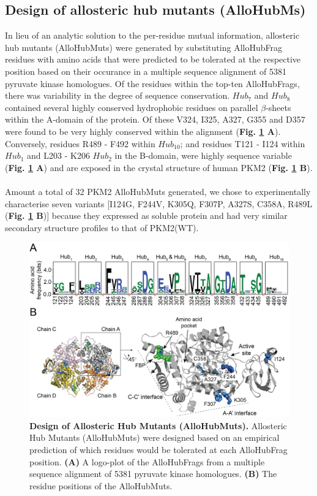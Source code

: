 \subsection{Design of allosteric hub mutants (AlloHubMs)}
In lieu of an analytic solution to the per-residue mutual information, allosteric hub mutants (AlloHubMuts) were generated by substituting AlloHubFrag residues with amino acids that were predicted to be tolerated at the respective position based on their occurance in a multiple sequence alignment of 5381 pyruvate kinase homologues. Of the residues within the top-ten AlloHubFrags, there was variability in the degree of sequence conservation. $Hub_7$ and $Hub_8$  contained several highly conserved hydrophobic residues on parallel $\beta$-sheets within the A-domain of the protein. Of these V324, I325, A327, G355 and D357 were found to be very highly conserved within the alignment (\textbf{Fig. \ref{fig:allohub_design} A}). Conversely, residues R489 - F492 within $Hub_{10}$; and residues T121 - I124 within $Hub_1$ and L203 - K206 $Hub_2$ in the B-domain, were highly sequence variable (\textbf{Fig. \ref{fig:allohub_design} A}) and are exposed in the crystal structure of human PKM2 (\textbf{Fig. \ref{fig:allohub_design} B}).
%
%
\\\\
%
%
Amount a total of 32 PKM2 AlloHubMuts generated, we chose to experimentally characterise seven variants [I124G, F244V, K305Q, F307P, A327S, C358A, R489L (\textbf{Fig. \ref{fig:allohub_design} B})] because they expressed as soluble protein and had very similar secondary structure profiles to that of PKM2(WT).
%
%
%
%
%
\begin{figure}[!ht]
\includegraphics[scale=0.7]{ch6_fig14_allohubfrag_sequence.png}
\caption[Design of Allosteric Hub Mutants (AlloHubMuts).]{\textbf{Design of Allosteric Hub Mutants (AlloHubMuts).} Allosteric Hub Mutants (AlloHubMuts) were designed based on an empirical prediction of which residues would be tolerated at each AlloHubFrag position. \textbf{(A)} A logo-plot of the AlloHubFrags from a multiple sequence alignment of 5381 pyruvate kinase homologues. \textbf{(B)} The residue positions of the AlloHubMuts.}
\label{fig:allohub_design}
\end{figure}

